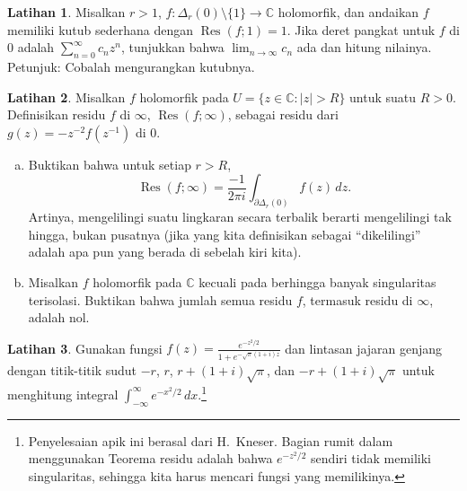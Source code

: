 \documentclass[12pt,openany]{book}
\newcommand{\sabs}[1]{\lvert {#1} \rvert}
\newcommand{\C}{{\mathbb{C}}}
\newcommand{\myquote}[1]{``#1''}
\theoremstyle{plain}
\theoremstyle{remark}
\theoremstyle{definition}
\newenvironment{exbox}{%
    \def\FrameCommand{\vrule width 1pt \relax\hspace{10pt}}%
    \MakeFramed{\advance\hsize-\width\FrameRestore}%
}{%
    \endMakeFramed
}
\newenvironment{exparts}{%
    \leavevmode\begin{enumerate}[a),noitemsep,topsep=0pt,parsep=0pt,partopsep=0pt]
}{%
    \end{enumerate}
}
\theoremstyle{exercise}
\newtheorem{exercise}{Latihan}[section]
\theoremstyle{example}
\begin{document}
\begin{savenotes}
\begin{exbox}
\begin{exercise}
Misalkan $r > 1$, $f \colon \Delta_r(0) \setminus \{ 1 \} \to \C$
holomorfik, dan andaikan $f$ memiliki kutub sederhana dengan $\operatorname{Res}(f;1) = 1$.
Jika deret pangkat untuk $f$ di $0$ adalah $\sum_{n=0}^\infty c_n z^n$, tunjukkan bahwa
$\lim_{n\to \infty} c_n$ ada dan hitung nilainya. Petunjuk: Cobalah
mengurangkan kutubnya.
\end{exercise}

\begin{exercise}
Misalkan $f$ holomorfik pada $U = \{ z \in \C : \sabs{z} > R \}$ untuk
suatu $R > 0$.
Definisikan residu $f$ di $\infty$,
$\operatorname{Res}(f;\infty)$, sebagai residu
dari $g(z) = -z^{-2} f(z^{-1})$ di $0$.
\begin{exparts}
\item
Buktikan bahwa untuk setiap $r > R$,
\begin{equation*}
\operatorname{Res}(f;\infty) = \frac{-1}{2\pi i} \int_{\partial \Delta_r(0)}
f(z) \, dz .
\end{equation*}
Artinya, mengelilingi suatu lingkaran secara terbalik berarti mengelilingi tak hingga,
bukan pusatnya (jika yang kita definisikan sebagai \myquote{dikelilingi} adalah apa pun
yang berada di sebelah kiri kita).
\item
Misalkan $f$ holomorfik pada $\C$ kecuali pada berhingga banyak singularitas
terisolasi. Buktikan bahwa jumlah semua residu $f$, termasuk
residu di $\infty$, adalah nol.
\end{exparts}
\end{exercise}

\begin{exercise}
Gunakan fungsi $f(z) = \frac{e^{-z^2/2}}{1+e^{-\sqrt{\pi}(1+i)z}}$ dan
lintasan jajaran genjang dengan titik-titik sudut $-r$, $r$, $r+(1+i)\sqrt{\pi}$,
dan $-r+(1+i)\sqrt{\pi}$
untuk menghitung integral $\int_{-\infty}^\infty e^{-x^2/2} \, dx$.\footnote{%
Penyelesaian apik ini berasal dari H.\ Kneser. Bagian rumit dalam menggunakan
Teorema residu adalah bahwa $e^{-z^2/2}$ sendiri tidak memiliki singularitas,
sehingga kita harus mencari fungsi yang memilikinya.}
\end{exercise}
\end{exbox}
\end{savenotes}

\end{document}
